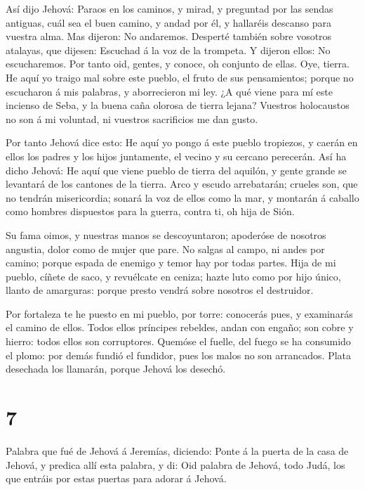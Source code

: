  Así dijo Jehová: Paraos en los caminos, y mirad, y
preguntad por las sendas antiguas, cuál sea el buen camino, y andad por
él, y hallaréis descanso para vuestra alma. Mas dijeron: No andaremos.
 Desperté también sobre vosotros atalayas, que dijesen:
Escuchad á la voz de la trompeta. Y dijeron ellos: No escucharemos.
 Por tanto oid, gentes, y conoce, oh conjunto de ellas.
 Oye, tierra. He aquí yo traigo mal sobre este pueblo, el
fruto de sus pensamientos; porque no escucharon á mis palabras, y
aborrecieron mi ley.  ¿A qué viene para mí este incienso de
Seba, y la buena caña olorosa de tierra lejana? Vuestros holocaustos no
son á mi voluntad, ni vuestros sacrificios me dan gusto.

 Por tanto Jehová dice esto: He aquí yo pongo á este pueblo
tropiezos, y caerán en ellos los padres y los hijos juntamente, el
vecino y su cercano perecerán.  Así ha dicho Jehová: He
aquí que viene pueblo de tierra del aquilón, y gente grande se levantará
de los cantones de la tierra.  Arco y escudo arrebatarán;
crueles son, que no tendrán misericordia; sonará la voz de ellos como la
mar, y montarán á caballo como hombres dispuestos para la guerra, contra
ti, oh hija de Sión.

 Su fama oimos, y nuestras manos se descoyuntaron;
apoderóse de nosotros angustia, dolor como de mujer que pare.
 No salgas al campo, ni andes por camino; porque espada de
enemigo y temor hay por todas partes.  Hija de mi pueblo,
cíñete de saco, y revuélcate en ceniza; hazte luto como por hijo único,
llanto de amarguras: porque presto vendrá sobre nosotros el destruidor.

 Por fortaleza te he puesto en mi pueblo, por torre:
conocerás pues, y examinarás el camino de ellos.  Todos
ellos príncipes rebeldes, andan con engaño; son cobre y hierro: todos
ellos son corruptores.  Quemóse el fuelle, del fuego se ha
consumido el plomo: por demás fundió el fundidor, pues los malos no son
arrancados.  Plata desechada los llamarán, porque Jehová
los desechó.

\hypertarget{section-6}{%
\section{7}\label{section-6}}

 Palabra que fué de Jehová á Jeremías, diciendo:
 Ponte á la puerta de la casa de Jehová, y predica allí esta
palabra, y di: Oid palabra de Jehová, todo Judá, los que entráis por
estas puertas para adorar á Jehová.

